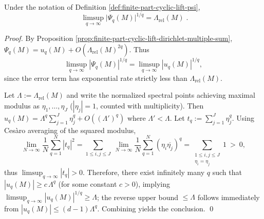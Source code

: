 \begin{theorem}\label{thm:finite-part-cyclic-lift-limsup-spectral-gap}
Under the notation of Definition \ref{def:finite-part-cyclic-lift-psi},
\[
\boxed{\;
\limsup_{q\to\infty}\bigl|\Psi_q(M)\bigr|^{1/q}
=\Lambda_{\mathrm{rel}}(M)\; }.
\]
\end{theorem}
\begin{proof}
By Proposition \ref{prop:finite-part-cyclic-lift-dirichlet-multiple-sum},
\(
\Psi_q(M)=u_q(M)+O(\Lambda_{\mathrm{rel}}(M)^{2q})
\).
Thus
\[
\limsup_{q\to\infty}|\Psi_q(M)|^{1/q}
=\limsup_{q\to\infty}|u_q(M)|^{1/q},
\]
since the error term has exponential rate strictly less than \(\Lambda_{\mathrm{rel}}(M)\).
\par
Let \(\Lambda:=\Lambda_{\mathrm{rel}}(M)\) and write the normalized spectral points achieving maximal modulus as \(\eta_1,\dots,\eta_J\) (\(|\eta_j|=1\), counted with multiplicity). Then
\(
 u_q(M)=\Lambda^{q}\sum_{j=1}^{J}\eta_j^{q}+O((\Lambda')^q)
\)
where \(\Lambda'<\Lambda\).
Let \(t_q:=\sum_{j=1}^{J}\eta_j^{q}\).
Using Ces\`aro averaging of the squared modulus,
\[
\lim_{N\to\infty}\frac{1}{N}\sum_{q=1}^{N}|t_q|^2
=\sum_{1\le i,j\le J}\ \lim_{N\to\infty}\frac{1}{N}\sum_{q=1}^{N}(\eta_i\overline{\eta_j})^{q}
=\sum_{\substack{1\le i,j\le J\\ \eta_i=\eta_j}}1\ >\ 0,
\]
thus \(\limsup_{q\to\infty}|t_q|>0\).
Therefore, there exist infinitely many \(q\) such that \(|u_q(M)|\ge c\,\Lambda^{q}\) (for some constant \(c>0\)), implying
\(\limsup_{q\to\infty}|u_q(M)|^{1/q}\ge \Lambda\);
the reverse upper bound \(\le \Lambda\) follows immediately from \(|u_q(M)|\le(d-1)\Lambda^{q}\).
Combining yields the conclusion. \qed
\end{proof}

